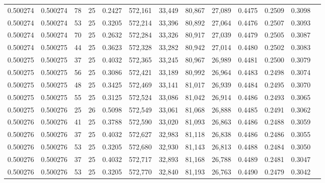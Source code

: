 \begin{tabular}{rrrrrrrrrrrrr}
0.500274 & 0.500274 &    78 &  25 &                                     0.2427 & 572,161 &  33,449 &  80,867 &  27,089 & 0.4475 & 0.2509 & 0.3098 \\
0.500274 & 0.500274 &    53 &  25 &                                     0.3205 & 572,214 &  33,396 &  80,892 &  27,064 & 0.4476 & 0.2507 & 0.3093 \\
0.500274 & 0.500274 &    70 &  25 &                                     0.2632 & 572,284 &  33,326 &  80,917 &  27,039 & 0.4479 & 0.2505 & 0.3087 \\
0.500274 & 0.500275 &    44 &  25 &                                     0.3623 & 572,328 &  33,282 &  80,942 &  27,014 & 0.4480 & 0.2502 & 0.3083 \\
0.500275 & 0.500275 &    37 &  25 &                                     0.4032 & 572,365 &  33,245 &  80,967 &  26,989 & 0.4481 & 0.2500 & 0.3079 \\
0.500275 & 0.500275 &    56 &  25 &                                     0.3086 & 572,421 &  33,189 &  80,992 &  26,964 & 0.4483 & 0.2498 & 0.3074 \\
0.500275 & 0.500275 &    48 &  25 &                                     0.3425 & 572,469 &  33,141 &  81,017 &  26,939 & 0.4484 & 0.2495 & 0.3070 \\
0.500275 & 0.500275 &    55 &  25 &                                     0.3125 & 572,524 &  33,086 &  81,042 &  26,914 & 0.4486 & 0.2493 & 0.3065 \\
0.500275 & 0.500276 &    25 &  26 &                                     0.5098 & 572,549 &  33,061 &  81,068 &  26,888 & 0.4485 & 0.2491 & 0.3062 \\
0.500276 & 0.500276 &    41 &  25 &                                     0.3788 & 572,590 &  33,020 &  81,093 &  26,863 & 0.4486 & 0.2488 & 0.3059 \\
0.500276 & 0.500276 &    37 &  25 &                                     0.4032 & 572,627 &  32,983 &  81,118 &  26,838 & 0.4486 & 0.2486 & 0.3055 \\
0.500276 & 0.500276 &    53 &  25 &                                     0.3205 & 572,680 &  32,930 &  81,143 &  26,813 & 0.4488 & 0.2484 & 0.3050 \\
0.500276 & 0.500276 &    37 &  25 &                                     0.4032 & 572,717 &  32,893 &  81,168 &  26,788 & 0.4489 & 0.2481 & 0.3047 \\
0.500276 & 0.500276 &    53 &  25 &                                     0.3205 & 572,770 &  32,840 &  81,193 &  26,763 & 0.4490 & 0.2479 & 0.3042 \\

\end{tabular}
